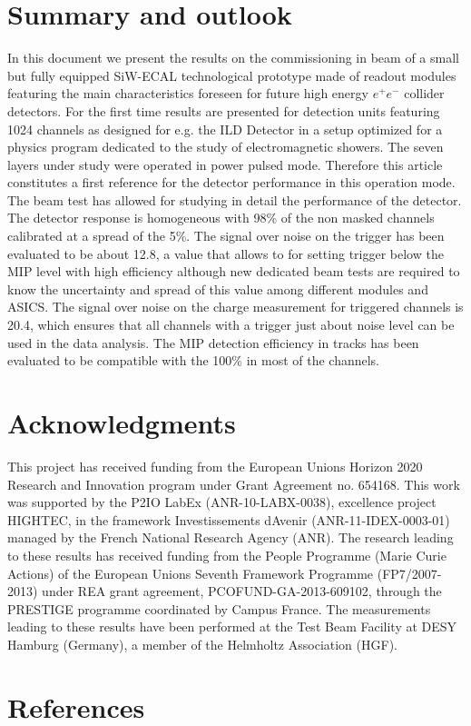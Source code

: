 \documentclass[final,3p,times,twocolumn]{elsarticle}
\begin{document}
\section{Summary and outlook}
\label{sec:summary}

In this document we present the results
on the commissioning in beam of a small but fully equipped SiW-ECAL technological prototype
made of readout modules featuring the main characteristics foreseen for future high energy $e^{+}e^{-}$ collider detectors.
For the first time results are presented for detection units featuring 1024 channels as
designed for e.g. the ILD Detector in a setup optimized for a physics program dedicated to the study
of electromagnetic showers. The seven layers under study were operated in power pulsed mode.
Therefore this article constitutes a first reference for the detector performance in this operation mode.  
The beam test has allowed for studying in detail 
the performance of the detector.
The detector response is homogeneous with
98\% of the non masked channels calibrated
at a spread of the 5\%.
The signal over noise on the trigger has been evaluated to be about 12.8, a value that allows to
for setting trigger below the MIP level with high efficiency 
although new dedicated beam tests are required to know the uncertainty and spread
of this value 
among different modules and ASICS.
The signal over noise on the charge measurement for triggered channels is 20.4, which 
ensures that all channels with a trigger just about noise level can be used in the data analysis.
The MIP detection efficiency in tracks has been evaluated to be compatible with the 100\% in most of the channels.


\section*{Acknowledgments}

This project has received funding from the European Union{\textquotesingle}s Horizon 2020 Research and Innovation program under Grant Agreement no. 654168.
This work was supported by the P2IO LabEx (ANR-10-LABX-0038), excellence project HIGHTEC,
in the framework {\textquotesingle}Investissements d{\textquotesingle}Avenir{\textquotesingle}
(ANR-11-IDEX-0003-01) managed by the French National Research Agency (ANR).
The research leading to these results has received funding from the People Programme (Marie
Curie Actions) of the European Union{\textquotesingle}s Seventh Framework Programme (FP7/2007-2013)
under REA grant agreement, PCOFUND-GA-2013-609102, through the PRESTIGE
programme coordinated by Campus France.
The measurements leading to these results have been performed at the Test Beam Facility at DESY Hamburg (Germany), a member of the Helmholtz Association (HGF).


%
\section*{References}


\end{document}
